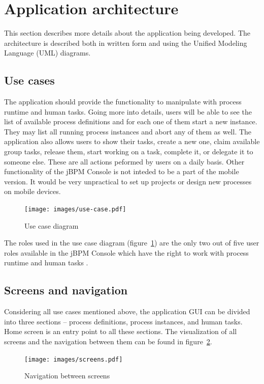 \documentclass[12pt,oneside,final]{fithesis2}
\begin{document}
\section{Application architecture}
This section describes more details about the application being developed.
The architecture is described both in written form and using the Unified Modeling Language (UML) diagrams.

\subsection{Use cases}
The application should provide the functionality to manipulate with process runtime and human tasks.
Going more into details, users will be able to see the list of available process definitions and for each one of them start a new instance.
They may list all running process instances and abort any of them as well.
The application also allows users to show their tasks, create a new one, claim available group tasks, release them, start working on a task, complete it, or delegate it to someone else.
These are all actions peformed by users on a daily basis.
Other functionality of the jBPM Console is not inteded to be a part of the mobile version.
It would be very unpractical to set up projects or design new processes on mobile devices.

\begin{figure}[ht!]
\centering
\texttt{[image: images/use-case.pdf]}
\caption{Use case diagram}
\label{fig:use-case}
\end{figure}

The roles used in the use case diagram (figure~\ref{fig:use-case}) are the only two out of five user roles available in the jBPM Console which have the right to work with process runtime and human tasks \cite{jbpm6roles}.

\subsection{Screens and navigation}
Considering all use cases mentioned above, the application GUI can be divided into three sections -- process definitions, process instances, and human tasks.
Home screen is an entry point to all these sections.
The visualization of all screens and the navigation between them can be found in figure~\ref{fig:screens}.

\begin{figure}[ht!]
\centering
\texttt{[image: images/screens.pdf]}
\caption{Navigation between screens}
\label{fig:screens}
\end{figure}
\end{document}
